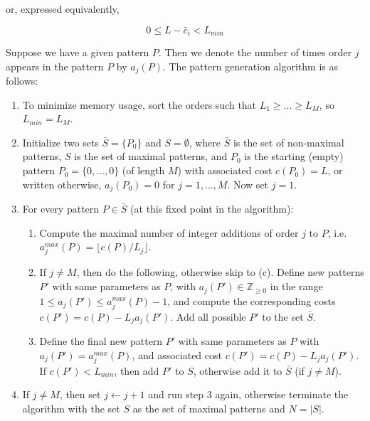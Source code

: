 \documentclass[12pt, a4paper]{article}
\begin{document}
or, expressed equivalently,

\begin{equation}
0 \leq L - \bar{c}_i < L_{min}
\end{equation}

Suppose we have a given pattern $P$. Then we denote the number of times order $j$ appears in the pattern $P$ by $a_j(P)$. The pattern generation algorithm is as follows:

\begin{enumerate}
	\item To minimize memory usage, sort the orders such that $ L_1 \geq \ldots \geq L_M  $, so $L_{min} = L_M$.
	\item Initialize two sets $\bar{S} = \{ P_0 \}$ and $S = \emptyset$, where $\bar{S}$ is the set of non-maximal patterns, $S$ is the set of maximal patterns, and $P_0$ is the starting (empty) pattern $P_0 = \{ 0,\ldots,0 \}$ (of length $M$) with associated cost $c(P_0) = L$, or written otherwise, $a_j(P_0) = 0$ for $j = 1,\ldots,M$. Now set $j = 1$.
	\item For every pattern $P \in \bar{S}$ (at this fixed point in the algorithm):
	\begin{enumerate}
		\item Compute the maximal number of integer additions of order $j$ to $P$, i.e. $a_j^{max}(P) = \lfloor c(P)/L_j \rfloor$.
		\item If $j \neq M$, then do the following, otherwise skip to (c). Define new patterns $P'$ with same parameters as $P$, with $a_j(P') \in \mathbb{Z}_{\geq 0}$ in the range $ 1 \leq a_j(P') \leq a_j^{max}(P)-1 $, and compute the corresponding costs $ c(P') = c(P) - L_j a_j(P')$. Add all possible $P'$ to the set $\bar{S}$.
		\item Define the final new pattern $P'$ with same parameters as $P$ with $a_j(P') = a_j^{max}(P)$, and associated cost $ c(P') = c(P) - L_j a_j(P') $. If $c(P') < L_{min}$, then add $P'$ to $S$, otherwise add it to $\bar{S}$ (if $j \neq M$).
	\end{enumerate}
	\item If $j \neq M$, then set $j \leftarrow j+1$ and run step 3 again, otherwise terminate the algorithm with the set $S$ as the set of maximal patterns and $N = |S|$.
\end{enumerate}
\end{document}
